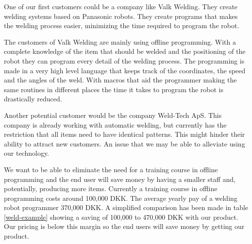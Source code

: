 One of our first customers could be a company like Valk Welding. They create welding systems based on Panasonic robots. They create programs that makes the welding process easier, minimizing the time required to program the robot.

The customers of Valk Welding are mainly using offline programming.
With a complete knowledge of the item that should be welded and the positioning of the robot they can program every detail of the welding process.
The programming is made in a very high level language that keeps track of the coordinates, the speed and the angles of the weld.
With macros that aid the programmer making the same routines in different places the time it takes to program the robot is drastically reduced.

Another potential customer would be the company Weld-Tech ApS. 
This company is already working with automatic welding, but currently has the restriction that all items need to have identical patterns. 
This might hinder their ability to attract new customers. An issue that we may be able to alleviate using our technology.


We want to be able to eliminate the need for a training course in offline programming and the end user will save money by having a smaller staff and, potentially, producing more items. 
Currently a training course in offline programming costs around 100,000 DKK\cite{valk_welding_summary}. 
The average yearly pay of a welding robot programmer 370,000 DKK\cite{welding_salary}. 
A simplified comparison has been made in table \ref{weld-example} showing a saving of 100,000 to 470,000 DKK with our product.
Our pricing is below this margin so the end users will save money by getting our product.

